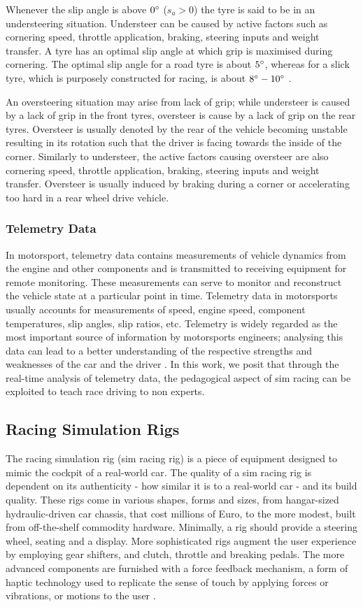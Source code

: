 \documentclass{sig-alternate}
\begin{document}
{Whenever the slip angle is above $0\degree$ ($s_a > 0$) the tyre is said to be in an understeering situation. Understeer can be caused by active factors such as cornering speed, throttle application, braking, steering inputs and weight transfer. A tyre has an optimal slip angle at which grip is maximised during cornering. The optimal slip angle for a road tyre is about $5\degree$, whereas for a slick tyre, which is purposely constructed for racing, is about $8\degree-10\degree$ \cite{beckman1991physics}.

An oversteering situation may arise from lack of grip; while understeer is caused by a lack of grip in the front tyres, oversteer is cause by a lack of grip on the rear tyres. Oversteer is usually denoted by the rear of the vehicle becoming unstable resulting in its rotation such that the driver is facing towards the inside of the corner. Similarly to understeer, the active factors causing oversteer are also cornering speed, throttle application, braking, steering inputs and weight transfer. Oversteer is usually induced by braking during a corner or accelerating too hard in a rear wheel drive vehicle.

\subsubsection{Telemetry Data}
In motorsport, telemetry data contains measurements of vehicle dynamics from the engine and other components and is transmitted to receiving equipment for remote monitoring. These measurements can serve to monitor and reconstruct the vehicle state at a particular point in time. Telemetry data in motorsports usually accounts for measurements of speed, engine speed, component temperatures, slip angles, slip ratios, etc. Telemetry is widely regarded as the most important source of information by motorsports engineers; analysing this data can lead to a better understanding of the respective strengths and weaknesses of the car and the driver \cite{CarDataAnalysis}. In this work, we posit that through the real-time analysis of telemetry data, the pedagogical aspect of sim racing can be exploited to teach race driving to non experts.

\subsection{Racing Simulation Rigs}
The racing simulation rig (sim racing rig) is a piece of equipment designed to mimic the cockpit of a real-world car. The quality of a sim racing rig is dependent on its authenticity - how similar it is to a real-world car - and its build quality. These rigs come in various shapes, forms and sizes, from hangar-sized hydraulic-driven car chassis, that cost millions of Euro, to the more modest, built from off-the-shelf commodity hardware. Minimally, a rig should provide a steering wheel, seating and a display. More sophisticated rigs augment the user experience by employing gear shifters, and clutch, throttle and breaking pedals. The more advanced components are furnished with a force feedback mechanism, a form of haptic technology used to replicate the sense of touch by applying forces or vibrations, or motions to the user \cite{li2015can}.

}
\end{document}
